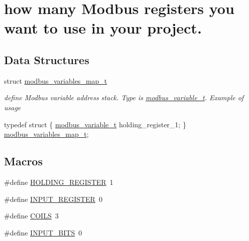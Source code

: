 \hypertarget{group___insert}{}\section{how many Modbus registers you want to use in your project.}
\label{group___insert}
\subsection*{Data Structures}
\begin{DoxyCompactItemize}
\item 
struct \mbox{\hyperlink{structmodbus__variables__map__t}{modbus\+\_\+variables\+\_\+map\+\_\+t}}
\begin{DoxyCompactList}\small\item\em define Modbus variable address stack. Type is \mbox{\hyperlink{structmodbus__variable__t}{modbus\+\_\+variable\+\_\+t}}. Example of usage 
\begin{DoxyCode}
\textcolor{keyword}{typedef} \textcolor{keyword}{struct }\{
   \mbox{\hyperlink{structmodbus__variable__t}{modbus\_variable\_t}} holding\_register\_1;
\} \mbox{\hyperlink{structmodbus__variables__map__t}{modbus\_variables\_map\_t}};
\end{DoxyCode}
 \end{DoxyCompactList}\end{DoxyCompactItemize}
\subsection*{Macros}
\begin{DoxyCompactItemize}
\item 
\#define \mbox{\hyperlink{group___insert_gae4693a6ca50104a719f8ed840bb419ac}{H\+O\+L\+D\+I\+N\+G\+\_\+\+R\+E\+G\+I\+S\+T\+ER}}~1
\item 
\#define \mbox{\hyperlink{group___insert_ga2f10b7e4e03726942f00d00c9888f2dc}{I\+N\+P\+U\+T\+\_\+\+R\+E\+G\+I\+S\+T\+ER}}~0
\item 
\#define \mbox{\hyperlink{group___insert_ga0b65fe24e4d83c129574194bea1ed036}{C\+O\+I\+LS}}~3
\item 
\#define \mbox{\hyperlink{group___insert_gaae865db01e31dbe4754638af380ff0d1}{I\+N\+P\+U\+T\+\_\+\+B\+I\+TS}}~0
\end{DoxyCompactItemize}
